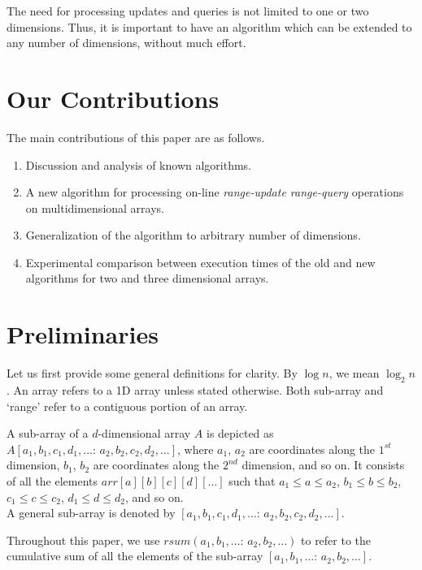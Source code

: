 \documentclass[a4paper]{article}
\begin{document}
\vspace{2 mm}
The need for processing updates and queries is not limited to one or two dimensions. Thus, it is important to have an algorithm which can be extended to any number of dimensions, without much effort.



\section{Our Contributions}
The main contributions of this paper are as follows.

\begin{enumerate}
\item Discussion and analysis of known algorithms.
\item A new algorithm for processing on-line \textit{range-update range-query} operations on multidimensional arrays.
\item Generalization of the algorithm to arbitrary number of dimensions.
\item Experimental comparison between execution times of the old and new algorithms for two and three dimensional arrays.
\end{enumerate}



\section{Preliminaries}
Let us first provide some general definitions for clarity. By $\log n$, we mean $\log_2 n$. An array refers to a 1D array unless stated otherwise. Both sub-array and `range' refer to a contiguous portion of an array.

\vspace{2 mm}
A sub-array of a $d$-dimensional array $A$ is depicted as $A[a_1, b_1, c_1, d_1, ... :\, a_2, b_2, c_2, d_2, ...]$, where $a_1$, $a_2$ are coordinates along the $1^{st}$ dimension, $b_1$, $b_2$ are coordinates along the $2^{nd}$ dimension, and so on. It consists of all the elements $arr[a][b][c][d][...]$ such that $a_1 \leq a \leq a_2$, $b_1 \leq b \leq b_2$, $c_1 \leq c \leq c_2$, $d_1 \leq d \leq d_2$, and so on.\\
A general sub-array is denoted by $[a_1, b_1, c_1, d_1, ... :\, a_2, b_2, c_2, d_2, ...]$.

\vspace{2 mm}
Throughout this paper, we use $rsum(a_1, b_1, ... :\, a_2, b_2, ...)$ to refer to the cumulative sum of all the elements of the sub-array $[a_1, b_1, ... :\, a_2, b_2, ...]$.
\end{document}
